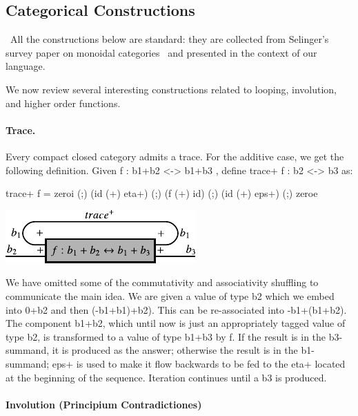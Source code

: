\documentclass[preprint]{sigplanconf}
\begin{document}
\subsection{Categorical Constructions}
\label{sec:neg-constructions}

\
All the constructions below are standard: they are collected from Selinger's
survey paper on monoidal
categories~\cite{springerlink:10.1007/978-3-642-12821-94} and presented in
the context of our language. 

We now review several interesting constructions related to looping,
involution, and higher order functions. 

\paragraph*{Trace.}
Every compact closed category admits a trace. For the additive case, we get
the following definition.  Given {{f : b1+b2 <-> b1+b3 }}, 
define {{trace+ f : b2 <-> b3}} as:

{{ trace+ f = zeroi (;) (id (+) eta+) (;) (f (+) id) (;) (id (+) eps+) (;) zeroe }} 

\begin{center}
  \includegraphics{diagrams/thesis/trace_plus.pdf}
\end{center}  

\noindent We have omitted some of the commutativity and associativity
shuffling to communicate the main idea. We are given a value of type
{{b2}} which we embed into {{0+b2}} and then {{(-b1+b1)+b2)}}. This
can be re-associated into {{-b1+(b1+b2)}}. The component {{b1+b2}},
which until now is just an appropriately tagged value of type {{b2}},
is transformed to a value of type {{b1+b3}} by {{f}}. 
If the result is in the {{b3}}-summand, it is produced as
the answer; otherwise the result is in the {{b1}}-summand; {{eps+}} is
used to make it flow backwards to be fed to the {{eta+}} located at
the beginning of the sequence. Iteration continues until a {{b3}} is
produced.


\paragraph*{Involution (Principium Contradictiones)}
\end{document}
